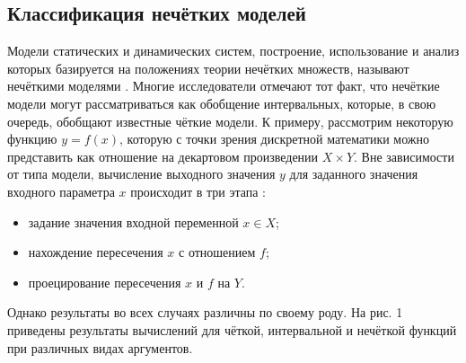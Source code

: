 \subsection{Классификация нечётких моделей}



Модели статических и динамических систем, построение, использование и анализ которых базируется на положениях теории нечётких множеств, называют нечёткими моделями \cite{Borisov_Fedulov}. Многие исследователи отмечают тот факт, что нечёткие модели могут рассматриваться как обобщение интервальных, которые, в свою очередь, обобщают известные чёткие модели. К примеру, рассмотрим некоторую функцию $y=f \left(x \right)$, которую с точки зрения дискретной математики можно представить как отношение на декартовом произведении $X \times Y$. Вне зависимости от типа модели, вычисление выходного значения $y$ для заданного значения входного параметра $x$ происходит в три этапа \cite{Borisov_Fedulov}:
\begin{itemize}
	\item задание значения входной переменной $x \in X$;
	\item нахождение пересечения $x$ с отношением $f$;
	\item проецирование пересечения $x$ и $f$ на $Y$.
\end{itemize}

Однако результаты во всех случаях различны по своему роду. На рис. 1 приведены результаты вычислений для чёткой, интервальной и нечёткой функций при различных видах аргументов. 

